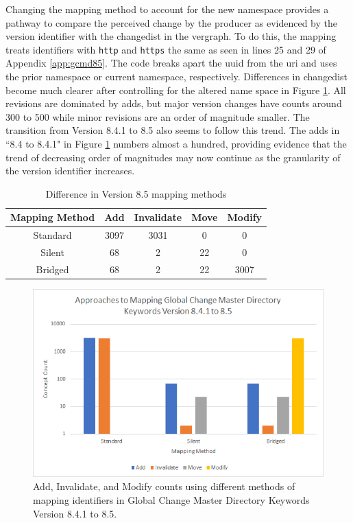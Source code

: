 Changing the mapping method to account for the new namespace provides a pathway to compare the perceived change by the producer as evidenced by the version identifier with the \gls{changedist} in the \gls{vergraph}.
To do this, the mapping treats identifiers with \texttt{http} and \texttt{https} the same as seen in lines 25 and 29 of Appendix \ref{app:gcmd85}.
The code breaks apart the \gls{uuid} from the \gls{uri} and uses the prior namespace or current namespace, respectively.
Differences in \gls{changedist} become much clearer after controlling for the altered name space in Figure \ref{GCMDC2}.
All revisions are dominated by \glspl{add}, but major version changes have counts around 300 to 500 while minor revisions are an order of magnitude smaller.
The transition from Version 8.4.1 to 8.5 also seems to follow this trend.
The \glspl{add} in ``8.4 to 8.4.1" in Figure \ref{GCMDC2} numbers almost a hundred, providing evidence that the trend of decreasing order of magnitudes may now continue as the granularity of the version identifier increases.

\begin{table}
	\caption{Difference in Version 8.5 mapping methods}
	\label{table:GCMD_8_5}
	\centering
	\begin{tabular}{|c|c|c|c|c|}
		\hline
		Mapping Method&	Add&	Invalidate&	Move&	Modify\\ \hline
		Standard&	3097&	3031&	0&	0\\
		Silent&	68&	2&	22&	0\\
		Bridged&	68&	2&	22&	3007\\		
		\hline
	\end{tabular}
\end{table}
\begin{figure}%
	\centering
	\includegraphics[scale=.9]{figures/GCMD8_5.png}
	\caption{Add, Invalidate, and Modify counts using different methods of mapping identifiers in Global Change Master Directory Keywords Version 8.4.1 to 8.5.}
	\label{GCMDC2}
\end{figure}


